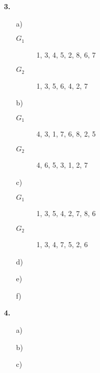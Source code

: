\documentclass[a4paper,11pt,fleqn]{scrartcl}
\begin{document}
\begin{enumerate}
\begin{enumerate}
		\end{enumerate}
		\item[\textbf{3.}]
		\begin{enumerate}
			\item[a)]\quad
			\begin{description}
				\item[$G_1$] 1, 3, 4, 5, 2, 8, 6, 7
				\item[$G_2$] 1, 3, 5, 6, 4, 2, 7
			\end{description}
			\item[b)]\quad
			\begin{description}
				\item[$G_1$] 4, 3, 1, 7, 6, 8, 2, 5
				\item[$G_2$] 4, 6, 5, 3, 1, 2, 7
			\end{description}
			\item[c)]\quad
			\begin{description}
				\item[$G_1$] 1, 3, 5, 4, 2, 7, 8, 6
				\item[$G_2$] 1, 3, 4, 7, 5, 2, 6
			\end{description}
			\item[d)]\quad \\
			\todo
			\item[e)]\quad \\
			\todo
			\item[f)]\quad \\
			\todo
		\end{enumerate}
		\item[\textbf{4.}]
		\begin{enumerate}
			\item[a)]\quad \\
			\todo
			\item[b)]\quad \\
			\todo
			\item[c)]\quad \\
			\todo
		\end{enumerate}
	\end{enumerate}
\end{document}
